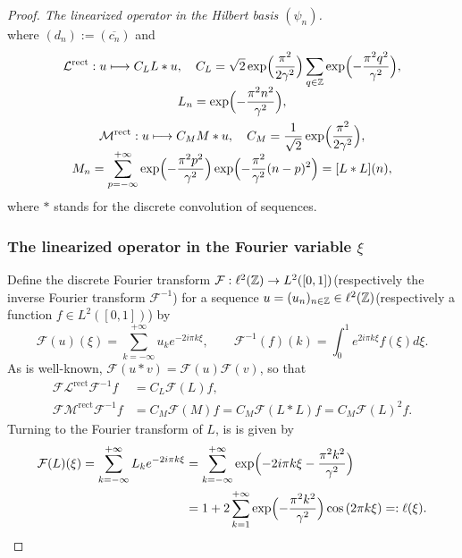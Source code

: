 \documentclass[10pt]{amsart}
\newcommand\mto{\mathchoice{\longmapsto}{\mapsto}{\mapsto}{\mapsto}}
\theoremstyle{definition}
\let\EE\exp
\let\dis\relax
\let\ov\overline
\newcommand\Z{\mathbb Z}
\newcommand{\pa}[1]{\left(#1\right)}
\begin{document}
\begin{proof}[Proof. The linearized operator in the Hilbert basis $(\psi_n)$]
\begin{equation*}
\end{equation*}
where $(d_n):= (\ov{c_n})$ and\vspace*{-3pt}
\begin{gather}
\mathcal{L}^{\mathrm{rect}}: u \mto C_L L * u, \quad C_L =\sqrt{2}\EE\Bigl({\frac{\pi^2}{2\gamma^2}}\Bigr)\sum_{q\in\Z}\EE\Bigl(-\frac{\pi^2q^2}{\gamma^2}\Bigr),\notag
\\[-5pt]
\label{def_op_L_rect}
L_n = \EE\Bigl(-\frac{\pi^2n^2}{\gamma^2}\Bigr),
\\
\mathcal{M}^{\mathrm{rect}}: u \mto C_M M * u, \quad C_M =\frac{1}{\sqrt{2}}\EE\Bigl({\frac{\pi^2}{2\gamma^2}}\Bigr),\notag
\\[-5pt]
\label{def_op_M_rect}
M_n = \sum_{p=-\infty}^{+\infty}\EE\Bigl({-\frac{\pi^2p^2}{\gamma^2}}\Bigr) \EE\Bigl({-\frac{\pi^2}{\gamma^2}(n-p)^2}\Bigr) = [L * L](n),
\end{gather} 
where $*$ stands for the discrete convolution of sequences.

\subsubsection*{The linearized operator in the Fourier variable $\xi$}
Define the discrete Fourier transform $\dis \mathcal{F}:\ell^2(\Z) \to L^2([0,1])$(respectively the inverse Fourier transform $\mathcal{F}^{-1}$) for a sequence $\dis u = (u_n)_{n\in\Z} \in \ell^2(\Z)$(respectively a function $f \in L^2([0,1])$) by
\begin{equation}
\label{deffourier}
\mathcal{F}(u)(\xi) = \sum_{k= -\infty}^{+\infty} u_ke^{- 2i\pi k \xi}, \qquad \mathcal{F}^{-1}(f)(k) = \int_0^1 e^{2i\pi k \xi} f(\xi) d\xi.
\end{equation}
As is well-known, $\mathcal{F}(u*v) = \mathcal{F}(u) \mathcal{F}(v)$, so that
\begin{align*}
\mathcal{F}\mathcal{L}^{\mathrm{rect}}\mathcal{F}^{-1}f&=C_L\mathcal{F}(L) f, \\
\mathcal{F}\mathcal{M}^{\mathrm{rect}}\mathcal{F}^{-1}f&=C_M\mathcal{F}(M) f = C_M\mathcal{F}(L*L) f = C_M \mathcal{F}(L)^2 f.
\end{align*}
Turning to the Fourier transform of $L$, is is given by
\begin{equation}\label{def_fct_l}
\begin{aligned}
\mathcal{F}(L)(\xi) = \sum_{k= -\infty}^{+\infty} L_ke^{-{2i\pi k}\xi} &= \sum_{k = -\infty}^{+\infty} \EE\Bigl({-{2i\pi k}\xi-\frac{\pi^2 k^2}{\gamma^2}}\Bigr)\\
&=1 + 2 \sum_{k=1}^{+\infty}\EE\Bigl({-\frac{\pi^2k^2}{\gamma^2}}\Bigr)\cos\pa{2\pi k\xi}=: \ell(\xi).
\end{aligned}
\end{equation}


\end{proof}
\end{document}
